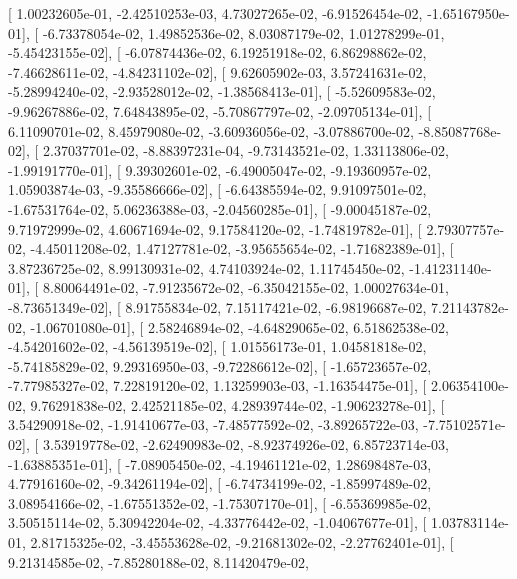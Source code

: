 \documentclass{article}
\begin{document}
       [  1.00232605e-01,  -2.42510253e-03,   4.73027265e-02,
         -6.91526454e-02,  -1.65167950e-01],
       [ -6.73378054e-02,   1.49852536e-02,   8.03087179e-02,
          1.01278299e-01,  -5.45423155e-02],
       [ -6.07874436e-02,   6.19251918e-02,   6.86298862e-02,
         -7.46628611e-02,  -4.84231102e-02],
       [  9.62605902e-03,   3.57241631e-02,  -5.28994240e-02,
         -2.93528012e-02,  -1.38568413e-01],
       [ -5.52609583e-02,  -9.96267886e-02,   7.64843895e-02,
         -5.70867797e-02,  -2.09705134e-01],
       [  6.11090701e-02,   8.45979080e-02,  -3.60936056e-02,
         -3.07886700e-02,  -8.85087768e-02],
       [  2.37037701e-02,  -8.88397231e-04,  -9.73143521e-02,
          1.33113806e-02,  -1.99191770e-01],
       [  9.39302601e-02,  -6.49005047e-02,  -9.19360957e-02,
          1.05903874e-03,  -9.35586666e-02],
       [ -6.64385594e-02,   9.91097501e-02,  -1.67531764e-02,
          5.06236388e-03,  -2.04560285e-01],
       [ -9.00045187e-02,   9.71972999e-02,   4.60671694e-02,
          9.17584120e-02,  -1.74819782e-01],
       [  2.79307757e-02,  -4.45011208e-02,   1.47127781e-02,
         -3.95655654e-02,  -1.71682389e-01],
       [  3.87236725e-02,   8.99130931e-02,   4.74103924e-02,
          1.11745450e-02,  -1.41231140e-01],
       [  8.80064491e-02,  -7.91235672e-02,  -6.35042155e-02,
          1.00027634e-01,  -8.73651349e-02],
       [  8.91755834e-02,   7.15117421e-02,  -6.98196687e-02,
          7.21143782e-02,  -1.06701080e-01],
       [  2.58246894e-02,  -4.64829065e-02,   6.51862538e-02,
         -4.54201602e-02,  -4.56139519e-02],
       [  1.01556173e-01,   1.04581818e-02,  -5.74185829e-02,
          9.29316950e-03,  -9.72286612e-02],
       [ -1.65723657e-02,  -7.77985327e-02,   7.22819120e-02,
          1.13259903e-03,  -1.16354475e-01],
       [  2.06354100e-02,   9.76291838e-02,   2.42521185e-02,
          4.28939744e-02,  -1.90623278e-01],
       [  3.54290918e-02,  -1.91410677e-03,  -7.48577592e-02,
         -3.89265722e-03,  -7.75102571e-02],
       [  3.53919778e-02,  -2.62490983e-02,  -8.92374926e-02,
          6.85723714e-03,  -1.63885351e-01],
       [ -7.08905450e-02,  -4.19461121e-02,   1.28698487e-03,
          4.77916160e-02,  -9.34261194e-02],
       [ -6.74734199e-02,  -1.85997489e-02,   3.08954166e-02,
         -1.67551352e-02,  -1.75307170e-01],
       [ -6.55369985e-02,   3.50515114e-02,   5.30942204e-02,
         -4.33776442e-02,  -1.04067677e-01],
       [  1.03783114e-01,   2.81715325e-02,  -3.45553628e-02,
         -9.21681302e-02,  -2.27762401e-01],
       [  9.21314585e-02,  -7.85280188e-02,   8.11420479e-02,
\end{document}
